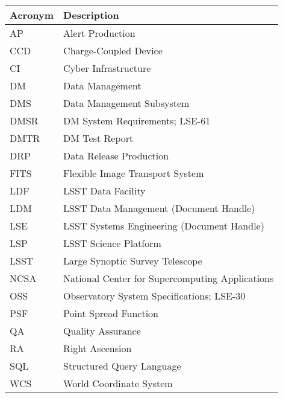 \addtocounter{table}{-1}
\begin{longtable}{p{}p{}}\hline
\textbf{Acronym} & \textbf{Description}  \\\hline

AP & Alert Production \\\hline
CCD & Charge-Coupled Device \\\hline
CI & Cyber Infrastructure \\\hline
DM & Data Management \\\hline
DMS & Data Management Subsystem \\\hline
DMSR & DM System Requirements; LSE-61 \\\hline
DMTR & DM Test Report \\\hline
DRP & Data Release Production \\\hline
FITS & Flexible Image Transport System \\\hline
LDF & LSST Data Facility \\\hline
LDM & LSST Data Management (Document Handle) \\\hline
LSE & LSST Systems Engineering (Document Handle) \\\hline
LSP & LSST Science Platform \\\hline
LSST & Large Synoptic Survey Telescope \\\hline
NCSA & National Center for Supercomputing Applications \\\hline
OSS & Observatory System Specifications; LSE-30 \\\hline
PSF & Point Spread Function \\\hline
QA & Quality Assurance \\\hline
RA & Right Ascension \\\hline
SQL & Structured Query Language \\\hline
WCS & World Coordinate System \\\hline
\end{longtable}
